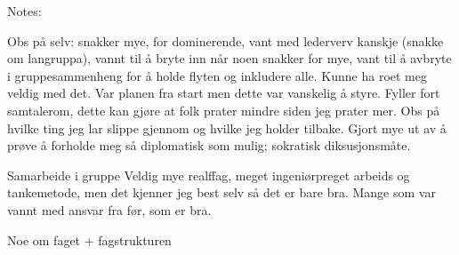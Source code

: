 Notes:

Obs på selv: 
snakker mye, for dominerende, vant med lederverv kanskje (snakke om langruppa), vannt til å bryte inn når noen snakker for mye, vant til å avbryte i gruppesammenheng for å holde flyten og inkludere alle. Kunne ha roet meg veldig med det. Var planen fra start men dette var vanskelig å styre. Fyller fort samtalerom, dette kan gjøre at folk prater mindre siden jeg prater mer. Obs på hvilke ting jeg lar slippe gjennom og hvilke jeg holder tilbake. Gjort mye ut av å prøve å forholde meg så diplomatisk som mulig; sokratisk diksusjonsmåte. 

Samarbeide i gruppe
Veldig mye realffag, meget ingeniørpreget arbeids og tankemetode, men det kjenner jeg best selv så det er bare bra. Mange som var vannt med ansvar fra før, som er bra. 

Noe om faget + fagstrukturen

